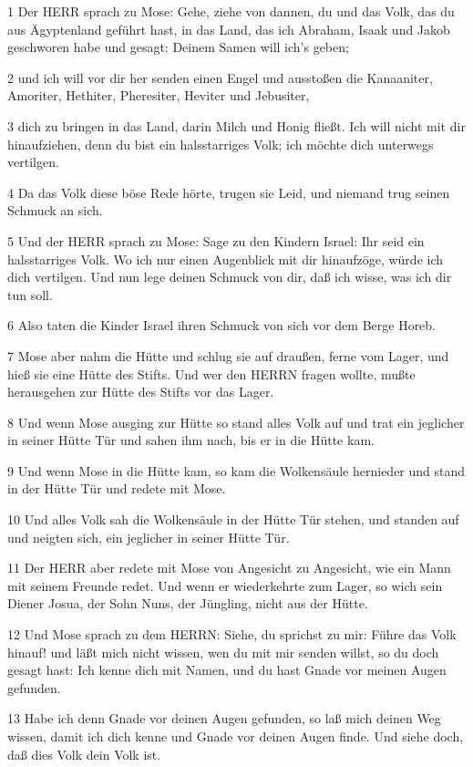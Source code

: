 \par 1 Der HERR sprach zu Mose: Gehe, ziehe von dannen, du und das Volk, das du aus Ägyptenland geführt hast, in das Land, das ich Abraham, Isaak und Jakob geschworen habe und gesagt: Deinem Samen will ich's geben;
\par 2 und ich will vor dir her senden einen Engel und ausstoßen die Kanaaniter, Amoriter, Hethiter, Pheresiter, Heviter und Jebusiter,
\par 3 dich zu bringen in das Land, darin Milch und Honig fließt. Ich will nicht mit dir hinaufziehen, denn du bist ein halsstarriges Volk; ich möchte dich unterwegs vertilgen.
\par 4 Da das Volk diese böse Rede hörte, trugen sie Leid, und niemand trug seinen Schmuck an sich.
\par 5 Und der HERR sprach zu Mose: Sage zu den Kindern Israel: Ihr seid ein halsstarriges Volk. Wo ich nur einen Augenblick mit dir hinaufzöge, würde ich dich vertilgen. Und nun lege deinen Schmuck von dir, daß ich wisse, was ich dir tun soll.
\par 6 Also taten die Kinder Israel ihren Schmuck von sich vor dem Berge Horeb.
\par 7 Mose aber nahm die Hütte und schlug sie auf draußen, ferne vom Lager, und hieß sie eine Hütte des Stifts. Und wer den HERRN fragen wollte, mußte herausgehen zur Hütte des Stifts vor das Lager.
\par 8 Und wenn Mose ausging zur Hütte so stand alles Volk auf und trat ein jeglicher in seiner Hütte Tür und sahen ihm nach, bis er in die Hütte kam.
\par 9 Und wenn Mose in die Hütte kam, so kam die Wolkensäule hernieder und stand in der Hütte Tür und redete mit Mose.
\par 10 Und alles Volk sah die Wolkensäule in der Hütte Tür stehen, und standen auf und neigten sich, ein jeglicher in seiner Hütte Tür.
\par 11 Der HERR aber redete mit Mose von Angesicht zu Angesicht, wie ein Mann mit seinem Freunde redet. Und wenn er wiederkehrte zum Lager, so wich sein Diener Josua, der Sohn Nuns, der Jüngling, nicht aus der Hütte.
\par 12 Und Mose sprach zu dem HERRN: Siehe, du sprichst zu mir: Führe das Volk hinauf! und läßt mich nicht wissen, wen du mit mir senden willst, so du doch gesagt hast: Ich kenne dich mit Namen, und du hast Gnade vor meinen Augen gefunden.
\par 13 Habe ich denn Gnade vor deinen Augen gefunden, so laß mich deinen Weg wissen, damit ich dich kenne und Gnade vor deinen Augen finde. Und siehe doch, daß dies Volk dein Volk ist.
